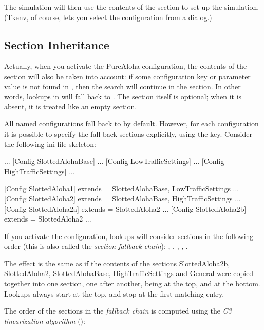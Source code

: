 The simulation will then use the contents of the 
section to set up the simulation. (Tkenv, of course, lets you select
the configuration from a dialog.)


\subsection{Section Inheritance}

Actually, when you activate the PureAloha configuration, the contents of
the \ttt{[General]} section will also be taken into account: if some
configuration key or parameter value is not found in ,
then the search will continue in the \ttt{[General]} section. In
other words, lookups in  will fall back to \ttt{[General]}.
The \ttt{[General]} section itself is optional; when it is absent, it is
treated like an empty \ttt{[General]} section.

All named configurations fall back to \ttt{[General]} by default. However, for
each configuration it is possible to specify the fall-back sections
explicitly, using the  key. Consider the following ini file
skeleton:

\begin{inifile}
[General]
...
[Config SlottedAlohaBase]
...
[Config LowTrafficSettings]
...
[Config HighTrafficSettings]
...

[Config SlottedAloha1]
extends = SlottedAlohaBase, LowTrafficSettings
...
[Config SlottedAloha2]
extends = SlottedAlohaBase, HighTrafficSettings
...
[Config SlottedAloha2a]
extends = SlottedAloha2
...
[Config SlottedAloha2b]
extends = SlottedAloha2
...
\end{inifile}


If you activate the  configuration, lookups will consider
sections in the following order (this is also called the
\textit{section fallback chain}): ,
, , ,
.

The effect is the same as if the contents of the sections
SlottedAloha2b, SlottedAloha2, SlottedAlohaBase, HighTrafficSettings and
General were copied together into one section, one after another,
 being at the top, and \ttt{[General]}
at the bottom. Lookups always start at the top, and stop at the first
matching entry.

The order of the sections in the \textit{fallback chain} is computed
using the \textit{C3 linearization algorithm} (\cite{Barrett1996}):

